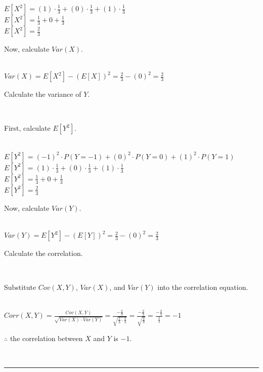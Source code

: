 \documentclass{article}
\begin{document}
$E[X^2] = (1) \cdot \frac{1}{3} + (0) \cdot \frac{1}{3} + (1) \cdot \frac{1}{3}$\\

$E[X^2] = \frac{1}{3} + 0 + \frac{1}{3}$\\

$E[X^2] = \frac{2}{3}$\\

\parbox{\textwidth}{Now, calculate $Var(X)$.}\\

$Var(X) = E[X^2] - (E[X])^2 = \frac{2}{3} - (0)^2 = \frac{2}{3}$\\

\parbox{\textwidth}{Calculate the variance of $Y$.}\\

\parbox{\textwidth}{First, calculate $E[Y^2]$.}\\

$E[Y^2] = (-1)^2 \cdot P(Y = -1) + (0)^2 \cdot P(Y = 0) + (1)^2 \cdot P(Y = 1)$\\

$E[Y^2] = (1) \cdot \frac{1}{3} + (0) \cdot \frac{1}{3} + (1) \cdot \frac{1}{3}$\\

$E[Y^2] = \frac{1}{3} + 0 + \frac{1}{3}$\\

$E[Y^2] = \frac{2}{3}$\\

\parbox{\textwidth}{Now, calculate $Var(Y)$.}\\

$Var(Y) = E[Y^2] - (E[Y])^2 = \frac{2}{3} - (0)^2 = \frac{2}{3}$\\

\parbox{\textwidth}{Calculate the correlation.}\\

\parbox{\textwidth}{Substitute $Cov(X,Y)$, $Var(X)$, and $Var(Y)$ into the correlation equation.}\\

$Corr(X,Y) = \frac{Cov(X,Y)}{\sqrt{Var(X) \cdot Var(Y)}} = \frac{-\frac{2}{3}}{\sqrt{\frac{2}{3} \cdot \frac{2}{3}}} = \frac{-\frac{2}{3}}{\sqrt{\frac{4}{9}}} = \frac{-\frac{2}{3}}{\frac{2}{3}} = -1$\\

\parbox{\textwidth}{$\therefore$ the correlation between $X$ and $Y$ is $-1$.}\\

\noindent\rule{\textwidth}{0.4pt}\\
\end{document}
